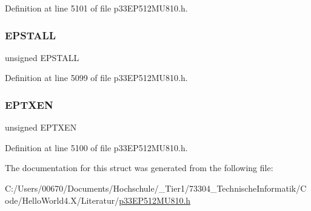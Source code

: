 Definition at line 5101 of file p33\+E\+P512\+M\+U810.\+h.

\mbox{\label{structtag_u1_e_p5_b_i_t_s_a47042104f04ebe06a23f9789bd400d7e}} 
\subsubsection{\texorpdfstring{E\+P\+S\+T\+A\+LL}{EPSTALL}}
{\footnotesize\ttfamily unsigned E\+P\+S\+T\+A\+LL}



Definition at line 5099 of file p33\+E\+P512\+M\+U810.\+h.

\mbox{\label{structtag_u1_e_p5_b_i_t_s_aa2d88c1be513e759c136823c86a355b4}} 
\subsubsection{\texorpdfstring{E\+P\+T\+X\+EN}{EPTXEN}}
{\footnotesize\ttfamily unsigned E\+P\+T\+X\+EN}



Definition at line 5100 of file p33\+E\+P512\+M\+U810.\+h.



The documentation for this struct was generated from the following file\+:\begin{DoxyCompactItemize}
\item 
C\+:/\+Users/00670/\+Documents/\+Hochschule/\+\_\+\+Tier1/73304\+\_\+\+Technische\+Informatik/\+Code/\+Hello\+World4.\+X/\+Literatur/\hyperlink{p33_e_p512_m_u810_8h}{p33\+E\+P512\+M\+U810.\+h}\end{DoxyCompactItemize}
